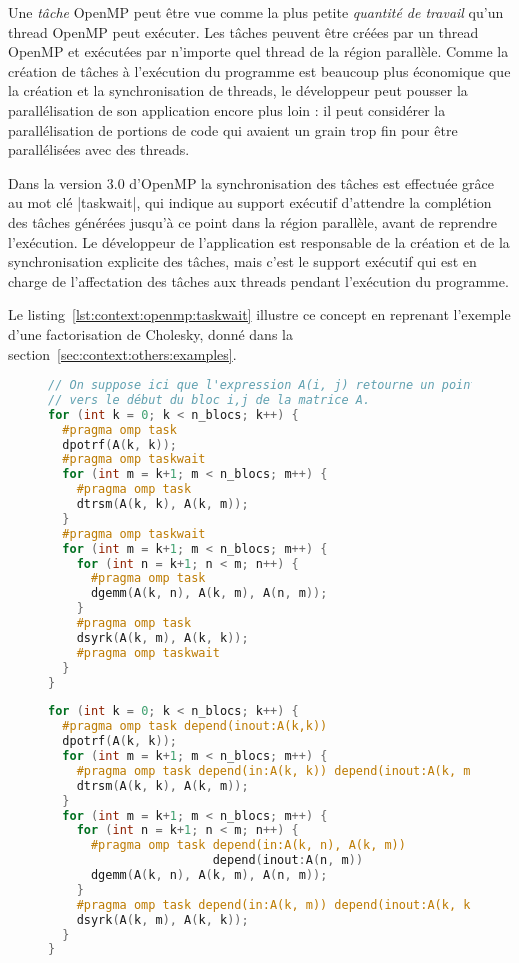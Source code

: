 Une \emph{tâche} OpenMP peut être vue comme la plus petite \emph{quantité de travail} qu'un thread OpenMP peut exécuter.
Les tâches peuvent être créées par un thread OpenMP et exécutées par n'importe quel thread de la région parallèle.
Comme la création de tâches à l'exécution du programme est beaucoup plus économique que la création et la synchronisation de threads, le développeur peut pousser la parallélisation de son application encore plus loin : il peut considérer la parallélisation de portions de code qui avaient un grain trop fin pour être parallélisées avec des threads.

Dans la version 3.0 d'OpenMP la synchronisation des tâches est effectuée grâce au mot clé |taskwait|, qui indique au support exécutif d'attendre la complétion des tâches générées jusqu'à ce point dans la région parallèle, avant de reprendre l'exécution.
Le développeur de l'application est responsable de la création et de la synchronisation explicite des tâches, mais c'est le support exécutif qui est en charge de l'affectation des tâches aux threads pendant l'exécution du programme.

Le listing~\ref{lst:context:openmp:taskwait} illustre ce concept en reprenant l'exemple d'une factorisation de Cholesky, donné dans la section~\ref{sec:context:others:examples}.

\begin{figure}[ht!]
\begin{lstlisting}[language=c++,caption=Création et synchronisation explicite de tâches,label=lst:context:openmp:taskwait]
// On suppose ici que l'expression A(i, j) retourne un pointeur
// vers le début du bloc i,j de la matrice A.
for (int k = 0; k < n_blocs; k++) {
  #pragma omp task
  dpotrf(A(k, k));
  #pragma omp taskwait
  for (int m = k+1; m < n_blocs; m++) {
    #pragma omp task
    dtrsm(A(k, k), A(k, m));
  }
  #pragma omp taskwait
  for (int m = k+1; m < n_blocs; m++) {
    for (int n = k+1; n < m; n++) {
      #pragma omp task
      dgemm(A(k, n), A(k, m), A(n, m));
    }
    #pragma omp task
    dsyrk(A(k, m), A(k, k));
    #pragma omp taskwait
  }
}
\end{lstlisting}
\end{figure}
\begin{figure}[h!]
\begin{lstlisting}[language=c++,caption=Exemple de tâches avec dépendances,label=lst:context:openmp:taskdep]
for (int k = 0; k < n_blocs; k++) {
  #pragma omp task depend(inout:A(k,k))
  dpotrf(A(k, k));
  for (int m = k+1; m < n_blocs; m++) {
    #pragma omp task depend(in:A(k, k)) depend(inout:A(k, m))
    dtrsm(A(k, k), A(k, m));
  }
  for (int m = k+1; m < n_blocs; m++) {
    for (int n = k+1; n < m; n++) {
      #pragma omp task depend(in:A(k, n), A(k, m))
                       depend(inout:A(n, m))
      dgemm(A(k, n), A(k, m), A(n, m));
    }
    #pragma omp task depend(in:A(k, m)) depend(inout:A(k, k))
    dsyrk(A(k, m), A(k, k));
  }
}
\end{lstlisting}
\end{figure}


